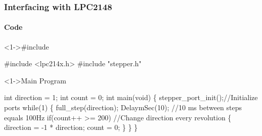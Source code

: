 \documentclass[table,10pt,red]{beamer}	%
\begin{document}
\begin{frame}[shrink = 2,fragile]
	\frametitle{Interfacing with LPC2148}
	\framesubtitle{Code}
	
	\pause
	\begin{block}<1->{\#include}
		\begin{semiverbatim}
			\scriptsize{
\#include <lpc214x.h>
\#include "stepper.h"
			}
		\end{semiverbatim}
	\end{block}
	\pause
	\begin{block}<1->{Main Program}
		\begin{semiverbatim}
			\scriptsize{
int direction = 1;
int count = 0;
int main(void)
\{
    stepper\_port\_init();\color{comment}//Initialize ports\color{black} \pause
    while(1)
    \{
        full\_step(direction); \pause
        DelaymSec(10); \color{comment}//10 ms between steps equals 100Hz\color{black} \pause
        if(count++ >= 200) \color{comment}//Change direction every revolution\color{black}
        \{
            direction = -1 * direction;
            count = 0;
        \}
    \}
\}
			}
		\end{semiverbatim}
	\end{block}
\end{frame}
\end{document}
